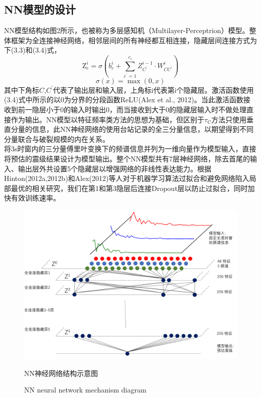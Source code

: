 \subsection{NN模型的设计}
\indent NN模型结构如图2所示，也被称为多层感知机（Multilayer-Perceptrion）模型。整体框架为全连接神经网络，相邻层间的所有神经都互相连接，隐藏层间连接方式为下(3.3)和(3.4)式，
\begin{equation}
\mathrm{Z}_{\mathrm{c}}^{i}=\sigma\left(b_{c}^{i}+\sum_{c^{\prime}=1}^{c_{i}} Z_{C^{\prime}}^{i-1} \cdot W_{C C^{\prime}}^{i}\right)
\end{equation}
\begin{equation}
\sigma(x)=\max (0, x)
\end{equation}
其中下角标$C$,$C^{\prime}$代表了输出层和输入层，上角标i代表第i个隐藏层。激活函数使用(3.4)式中所示的以0为分界的分段函数ReLU(Alex et al., 2012)。当此激活函数接收到前一隐层小于0的输入时输出0，而当接收到大于0的隐藏层输入时不做处理直接作为输出。NN模型以特征频率类方法的思想为基础，但区别于$\tau_{\mathrm{C}}$方法只使用垂直分量的信息，此NN神经网络的使用台站记录的全三分量信息，以期望得到不同分量联合与破裂规模的内在关系。\\
\indent 将3s时窗内的三分量傅里叶变换下的频谱信息并列为一维向量作为模型输入，直接将预估的震级结果设计为模型输出。整个NN模型共有7层神经网络，除去首尾的输入、输出层外共设置5个隐藏层以增强网络的非线性表达能力。根据Hinton(2012a,2012b)和Alex(2012)等人对于机器学习算法过拟合和避免网络陷入局部最优的相关研究，我们在第1和第3隐层后连接Dropout层以防止过拟合，同时加快有效训练速率。\\
\begin{figure}[!h] 
\centering 
 \includegraphics[width=0.99\linewidth]{img/NN.png} 
 \renewcommand{\figurename}{图} 
\caption{NN神经网络结构示意图} 
\addtocounter{figure}{-1} \vspace{-5pt} 
\renewcommand{\figurename}{Fig} 
\caption{NN neural network mechanism diagram} 
\renewcommand{\figurename}{图} 
\label{fig:network-device-influence.png} 
\end{figure}
